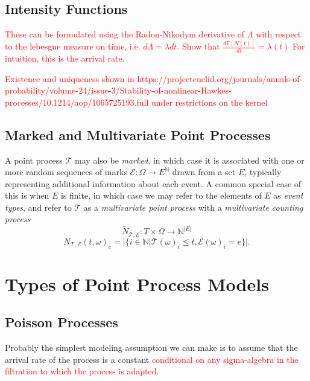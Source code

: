 \documentclass[honours,12pt]{unswthesis}
\numberwithin{equation}{section}
\begin{document}
\subsection{Intensity Functions}
\textcolor{red}{These can be formulated using the Radon-Nikodym derivative of $\Lambda$ with respect to the lebesgue measure on time, i.e. $d\Lambda=\lambda dt$.}
\textcolor{red}{Show that $\frac{d\mathbb{E}[N(t)]}{dt}=\lambda(t)$}
\textcolor{red}{For intuition, this is the arrival rate.}

\textcolor{red}{Existence and uniqueness shown in https://projecteuclid.org/journals/annals-of-probability/volume-24/issue-3/Stability-of-nonlinear-Hawkes-processes/10.1214/aop/1065725193.full under restrictions on the kernel}


\subsection{Marked and Multivariate Point Processes}

{\noindent}A point process $\mathcal T$ may also be \textit{marked}, in which case it is associated with one or more random sequences of marks $\mathcal E:\Omega\to E^{\mathbb N}$ drawn from a set $E$, typically representing additional information about each event. A common special case of this is when $E$ is finite, in which case we may refer to the elements of $E$ as \textit{event types}, and refer to $\mathcal T$ as a \textit{multivariate point process} with a \textit{multivariate counting process}
$${\tilde N}_{\mathcal T, \mathcal E} : T\times\Omega \to \mathbb N ^ {\vert E \vert}$$
$$N_{\mathcal T, \mathcal E}(t,\omega)_e = \vert \{i\in\mathbb N \vert \mathcal{T}(\omega)_i \leq t, \mathcal{E}(\omega)_i=e\} \vert.$$




\section{Types of Point Process Models}

\subsection{Poisson Processes}
Probably the simplest modeling assumption we can make is to assume that the arrival rate of the process is a constant \textcolor{red}{conditional on any sigma-algebra in the filtration to which the process is adapted}.
\end{document}
